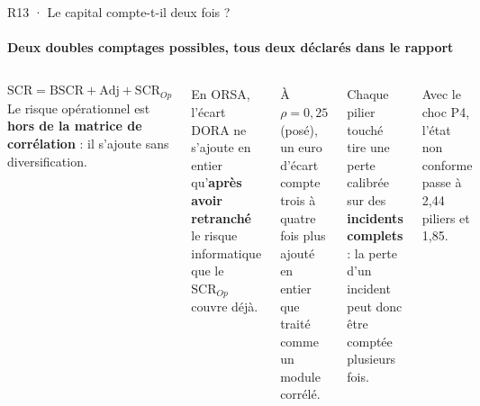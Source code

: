 \documentclass[aspectratio=169,10pt,t]{beamer}
\renewcommand{\arraystretch}{1.25}
\begin{document}
\begin{frame}[label=reserve-double-comptage]{R13 · Le capital compte-t-il deux fois ?}
  \framesubtitle{Deux doubles comptages possibles, tous deux déclarés dans le rapport}
  \begin{columns}[T,onlytextwidth]
    \footnotesize
    \[\mathrm{SCR}=\mathrm{BSCR}+\mathrm{Adj}+\mathrm{SCR}_{Op}\]
    Le risque opérationnel est \textbf{hors de la matrice de corrélation} : il s'ajoute sans diversification.\par\vspace{1mm}
    En ORSA, l'écart DORA ne s'ajoute en entier qu'\textbf{après avoir retranché} le risque informatique que le $\mathrm{SCR}_{Op}$ couvre déjà.\par\vspace{1mm}
    {\scriptsize À $\rho=0{,}25$ (posé), un euro d'écart compte trois à quatre fois plus ajouté en entier que traité comme un module corrélé.\par}
    \footnotesize
    Chaque pilier touché tire une perte calibrée sur des \textbf{incidents complets} : la perte d'un incident peut donc être comptée plusieurs fois.\par\vspace{1mm}
    \renewcommand{\arraystretch}{1.15}
    {\centering\scriptsize{}\par}\vspace{1mm}
    {\scriptsize Avec le choc P4, l'état non conforme passe à 2,44 piliers et 1,85.\par}
  \end{columns}
\end{frame}
\end{document}
